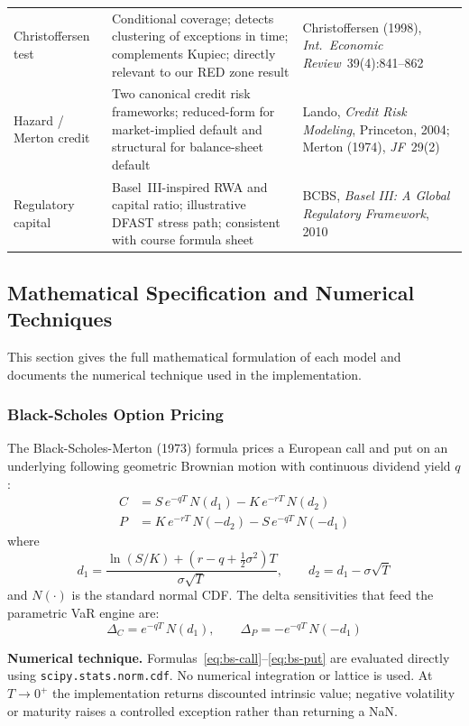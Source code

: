 \documentclass[11pt]{article}
\newcommand{\code}[1]{\texttt{#1}}
\begin{document}
\begin{center}
\begin{tabular}{L{2.6cm}L{4.5cm}L{5.8cm}}
Christoffersen test
  & Conditional coverage; detects clustering of exceptions in time;
    complements Kupiec; directly relevant to our RED zone result
  & Christoffersen (1998), \textit{Int.\ Economic Review}~39(4):841--862 \\[4pt]
Hazard / Merton credit
  & Two canonical credit risk frameworks; reduced-form for market-implied
    default and structural for balance-sheet default
  & Lando, \textit{Credit Risk Modeling}, Princeton, 2004;
    Merton (1974), \textit{JF}~29(2) \\[4pt]
Regulatory capital
  & Basel~III-inspired RWA and capital ratio; illustrative DFAST stress
    path; consistent with course formula sheet
  & BCBS, \textit{Basel III: A Global Regulatory Framework}, 2010 \\
\bottomrule
\end{tabular}
\end{center}

\subsection{Mathematical Specification and Numerical Techniques}
\label{sec:math-spec}

This section gives the full mathematical formulation of each model and
documents the numerical technique used in the implementation.

\subsubsection{Black-Scholes Option Pricing}

The Black-Scholes-Merton (1973) formula prices a European call and put on
an underlying following geometric Brownian motion with continuous dividend
yield $q$:
\begin{align}
C &= S\,e^{-qT}\,N(d_1) - K\,e^{-rT}\,N(d_2) \label{eq:bs-call}\\
P &= K\,e^{-rT}\,N(-d_2) - S\,e^{-qT}\,N(-d_1) \label{eq:bs-put}
\end{align}
where
\[
d_1 = \frac{\ln(S/K)+(r-q+\tfrac{1}{2}\sigma^2)T}{\sigma\sqrt{T}},
\qquad
d_2 = d_1 - \sigma\sqrt{T}
\]
and $N(\cdot)$ is the standard normal CDF.  The delta sensitivities
that feed the parametric VaR engine are:
\[
\Delta_C = e^{-qT}\,N(d_1), \qquad \Delta_P = -e^{-qT}\,N(-d_1)
\]

\textbf{Numerical technique.}  Formulas~\eqref{eq:bs-call}--\eqref{eq:bs-put}
are evaluated directly using \code{scipy.stats.norm.cdf}.  No numerical
integration or lattice is used.  At $T \to 0^+$ the implementation returns
discounted intrinsic value; negative volatility or maturity raises a
controlled exception rather than returning a NaN.
\end{document}
